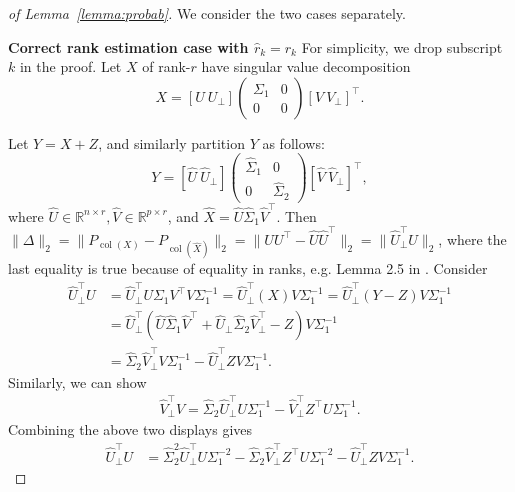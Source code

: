 \documentclass{amsart}
\DeclareMathOperator*{\col}{col}
\begin{document}
\begin{proof}[of Lemma~\ref{lemma:probab}] {We consider the two cases separately.

\vspace{0.1in}
\noindent\textbf{Correct rank estimation case with $\widehat r_k = r_k$} For simplicity, we drop subscript $k$ in the proof. Let $X$ of rank-$r$ have singular value decomposition
$$
X = [U\ U_{\perp}]\begin{pmatrix} \Sigma_1 & 0\\0&0 \end{pmatrix} [V\ V_{\perp}]^{\top}.
$$}
{Let $Y = X + Z$, and similarly partition $Y$ as follows:
$$
Y = [\widehat U\ \widehat U_{\perp}]\begin{pmatrix} \widehat \Sigma_1 & 0\\0&\widehat \Sigma_2 \end{pmatrix} [\widehat V\ \widehat V_{\perp}]^{\top},
$$
where $\widehat U \in \mathbb{R}^{n \times r}, \widehat V \in \mathbb{R}^{p \times r}$, and $\widehat X = \widehat U \widehat \Sigma_1 \widehat V^{\top}$. Then $\|\Delta\|_2 = \|P_{{\col (X)}} - P_{\col (\widehat{X})}\|_2 = \|UU^{\top} - \widehat U \widehat U^\top\|_2 = \|\widehat U_{\perp}^{\top}U\|_2$, where the last equality is true because of equality in ranks, e.g. Lemma 2.5 in \citet{chenSpectralMethodsData2021}. Consider
\begin{align*}
\widehat U_{\perp}^{\top}U &= \widehat U_{\perp}^{\top}U\Sigma_1V^{\top}V\Sigma_1^{-1} = \widehat U_{\perp}^{\top}(X)V\Sigma_1^{-1} =\widehat U_{\perp}^{\top}(Y - Z) V\Sigma_1^{-1} \\
&=\widehat U_{\perp}^{\top}(\widehat U\widehat \Sigma_1\widehat V^{\top} + \widehat U_{\perp}\widehat \Sigma_2\widehat V_{\perp}^{\top} - Z) V\Sigma_1^{-1} \\
&= \widehat \Sigma_2 \widehat V_{\perp}^{\top}V\Sigma_1^{-1} - \widehat U_{\perp}^{\top}ZV\Sigma_1^{-1}.
\end{align*}
Similarly, we can show
\begin{align*}
\widehat V_{\perp}^{\top}V = \widehat \Sigma_2 \widehat U_{\perp}^{\top}U\Sigma_1^{-1} - \widehat V_{\perp}^{\top}Z^{\top}U\Sigma_{1}^{-1}.
\end{align*}
Combining the above two displays gives
\begin{align*}
\widehat U_{\perp}^{\top}U &= \widehat \Sigma_2 ^2 \widehat U_{\perp}^{\top}U\Sigma_1^{-2} -\widehat \Sigma_2 \widehat V_{\perp}^{\top}Z^{\top}U\Sigma_{1}^{-2} - \widehat U_{\perp}^{\top}ZV\Sigma_1^{-1}.
\end{align*}
}
\end{proof}
\end{document}
